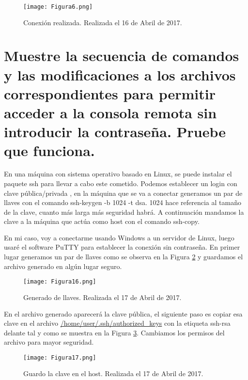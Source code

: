 \begin{figure}[H] 
\centering
\texttt{[image: Figura6.png]}  
\caption{Conexión realizada. Realizada el 16 de Abril de 2017.} \label{fig:figura6}
\end{figure}





\section{Muestre la secuencia de comandos y las modificaciones a los archivos correspondientes para permitir acceder a la consola remota sin introducir la contraseña. Pruebe que funciona.}

En una máquina con sistema operativo basado en Linux, se puede instalar el paquete ssh para llevar a cabo este cometido.
Podemos establecer un login con clave pública/privada \cite{sshkey}, en la máquina que se va a conectar generamos un par de llaves con el 
comando ssh-keygen -b 1024 -t dsa. 1024 hace referencia al tamaño de la clave, cuanto más larga más seguridad habrá.
A continuación mandamos la clave a la máquina que actúa como host con el comando ssh-copy.

\vspace{6mm}

En mi caso, voy a conectarme usando Windows a un servidor de Linux, luego usaré el software PuTTY\cite{putty} para establecer la conexión sin contraseña.
En primer lugar generamos un par de llaves como se observa en la Figura \ref{fig:figura16} y guardamos el archivo generado en algún lugar seguro.

\begin{figure}[H] 
\centering
\texttt{[image: Figura16.png]}  
\caption{Generado de llaves. Realizada el 17 de Abril de 2017.} \label{fig:figura16}
\end{figure}

En el archivo generado aparecerá la clave pública, el siguiente paso es copiar esa clave en el archivo \url{/home/user/.ssh/authorized_keys} con la etiqueta ssh-rsa delante tal y como se muestra en la Figura \ref{fig:figura17}.
Cambiamos los permisos del archivo para mayor seguridad.

\begin{figure}[H] 
\centering
\texttt{[image: Figura17.png]}  
\caption{Guardo la clave en el host. Realizada el 17 de Abril de 2017.} \label{fig:figura17}
\end{figure}

